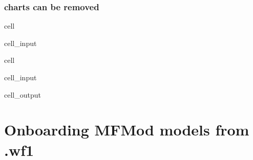 \documentclass[letterpaper,10pt,english]{jupyterBook}
\begin{document}
\section{charts can be removed}
\label{\detokenize{content/howto/keep/Create and modify charts with keep_plot:charts-can-be-removed}}
\begin{sphinxuseclass}{cell}\begin{sphinxVerbatimInput}

\begin{sphinxuseclass}{cell_input}
\begin{sphinxVerbatim}[commandchars=\\\{\}]
\PYG{p}{[}\PYG{p}{]}
\end{sphinxVerbatim}

\end{sphinxuseclass}\end{sphinxVerbatimInput}

\end{sphinxuseclass}
\begin{sphinxuseclass}{cell}\begin{sphinxVerbatimInput}

\begin{sphinxuseclass}{cell_input}
\begin{sphinxVerbatim}[commandchars=\\\{\}]
\end{sphinxVerbatim}

\end{sphinxuseclass}\end{sphinxVerbatimInput}
\begin{sphinxVerbatimOutput}

\begin{sphinxuseclass}{cell_output}
\noindent{}

\end{sphinxuseclass}\end{sphinxVerbatimOutput}

\end{sphinxuseclass}
\sphinxstepscope


\part{Onboarding MFMod models from .wf1}
\end{document}
